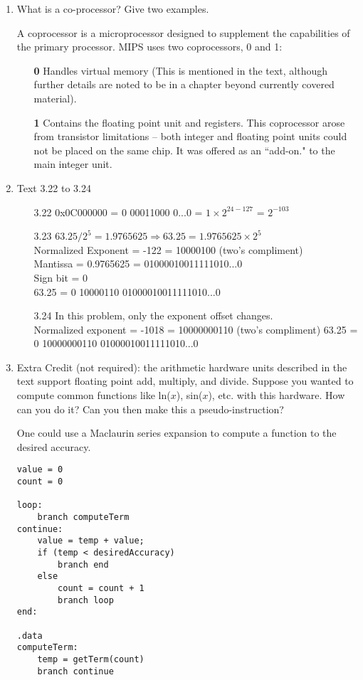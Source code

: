\documentclass[]{3330hw}
\begin{document}
\begin{enumerate}
\item What is a co-processor? Give two examples.

A coprocessor is a microprocessor designed to supplement the capabilities of the primary processor. MIPS uses two coprocessors, 0 and 1:
\begin{itemize}
	\item [\textbf{0}] Handles virtual memory (This is mentioned in the text, although further details are noted to be in a chapter beyond currently covered material). 
	\item [\textbf{1}] Contains the floating point unit and registers. This coprocessor arose from transistor limitations -- both integer and floating point units could not be placed on the same chip. It was offered as an ``add-on." to the main integer unit. 
\end{itemize}

\item Text 3.22 to 3.24

\begin{enumerate}
	\item [3.22] 0x0C000000 = 0 00011000 0...0 = $1 \times 2^{24-127}$ = $2^{-103}$
	\item [3.23] $63.25 / 2^5 = 1.9765625 \Rightarrow 63.25 = 1.9765625 \times 2^{5}$\\
				 Normalized Exponent = -122 = 10000100 (two's compliment) \\
				 Mantissa = 0.9765625 = 01000010011111010...0\\ 
				 Sign bit = 0\\
				 63.25 = 0 10000110 01000010011111010...0
	\item [3.24] In this problem, only the exponent offset changes.\\
				 Normalized exponent = -1018 = 10000000110 (two's compliment)
				 63.25 = 0 10000000110 01000010011111010...0
\end{enumerate}

\item Extra Credit (not required): the arithmetic hardware units described in the text support floating point add, multiply, and divide. Suppose you wanted to compute common functions like ln($x$), sin($x$), etc. with this hardware. How can you do it? Can you then make this a pseudo-instruction?

One could use a Maclaurin series expansion to compute a function to the desired accuracy. 

\begin{lstlisting}
value = 0
count = 0

loop:
	branch computeTerm
continue:
	value = temp + value;
	if (temp < desiredAccuracy)
		branch end
	else
		count = count + 1
		branch loop
end:

.data
computeTerm:
	temp = getTerm(count)	
	branch continue

\end{lstlisting}
	
\end{enumerate}
\end{document}

